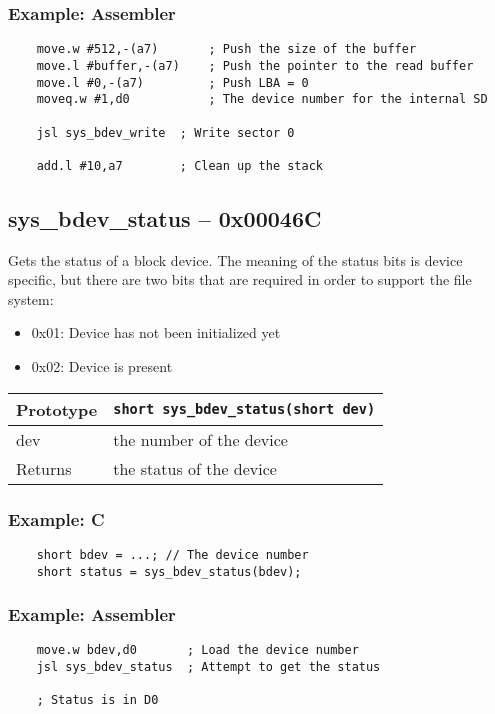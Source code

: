 \subsubsection*{Example: Assembler}
\begin{verbatim}
    move.w #512,-(a7)   	; Push the size of the buffer
    move.l #buffer,-(a7)    ; Push the pointer to the read buffer
    move.l #0,-(a7)     	; Push LBA = 0
    moveq.w #1,d0       	; The device number for the internal SD

    jsl sys_bdev_write	; Write sector 0

    add.l #10,a7        ; Clean up the stack
\end{verbatim}

\subsection*{sys\_bdev\_status -- 0x00046C}
Gets the status of a block device. The meaning of the status bits is device specific, but there are two bits that are required in order to support the file system:
\begin{itemize}
    \item 0x01: Device has not been initialized yet
    \item 0x02: Device is present
\end{itemize}

\bigskip

\begin{tabular}{|l||l|} \hline
Prototype & \lstinline!short sys_bdev_status(short dev)! \\ \hline
dev & the number of the device \\ \hline
Returns & the status of the device \\ \hline
\end{tabular}

\subsubsection*{Example: C}
\begin{lstlisting}
    short bdev = ...; // The device number
    short status = sys_bdev_status(bdev);
\end{lstlisting}

\subsubsection*{Example: Assembler}
\begin{verbatim}
    move.w bdev,d0       ; Load the device number
    jsl sys_bdev_status  ; Attempt to get the status

    ; Status is in D0
\end{verbatim}


